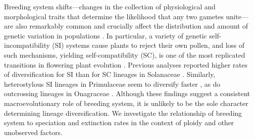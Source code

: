 Breeding system shifts---changes in the collection of physiological and morphological traits that determine the likelihood that any two gametes unite---are also remarkably common and crucially affect the distribution and amount of genetic variation in populations \citep{barrett2013}. %
In particular, a variety of genetic self-incompatibility (SI) systems cause plants to reject their own pollen, and loss of such mechanisms, yielding self-compatibility (SC), is one of the most replicated transitions in flowering plant evolution \citep{stebbins1974, igic_2008}.
Previous analyses reported higher rates of diversification for SI than for SC lineages in Solanaceae \citep{goldberg_2010}. 
Similarly, heterostylous SI lineages in Primulaceae seem to diversify faster \citep{devos2014}, as do outcrossing lineages in Onagraceae \citep{freyman_2019}.
Although these findings suggest a consistent macroevolutionary role of breeding system, it is unlikely to be the sole character determining lineage diversification.
We investigate the relationship of breeding system to speciation and extinction rates in the context of ploidy and other unobserved factors.

